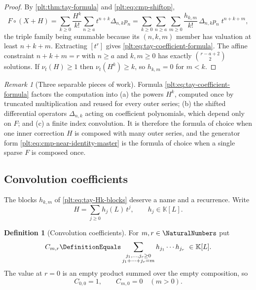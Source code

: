 \documentclass[11pt,oneside]{article}
\theoremstyle{plain}
\theoremstyle{definition}
\newtheorem{definition}[theorem]{Definition}
\theoremstyle{remark}
\newtheorem{remark}[theorem]{Remark}
\newcommand{\K}{\mathbb{K}}
\newcommand{\ordt}{\nu_{t}}                              %
\newcommand{\shiftop}[2]{\Delta_{#1,#2}}                 %
\newcommand{\compose}{\mathbin{\circ}}
\begin{document}
\begin{proof}
By \cref{plt:thm:tay-formula} and \eqref{plt:eq:cmp-shiftop},
\[
 F\compose(X+H)
 =\sum_{k\ge0}\frac{H^{k}}{k!}\sum_{n\ge a}t^{n+k}\shiftop{n}{k}p_n
 =\sum_{k\ge0}\sum_{n\ge a}\sum_{m\ge0}
   \frac{h_{k,m}}{k!}\,\shiftop{n}{k}p_n\;t^{n+k+m},
\]
the triple family being summable because its \((n,k,m)\) member has
valuation at least \(n+k+m\).  Extracting \([t^{r}]\) gives
\eqref{plt:eq:tay-coefficient-formula}.  The affine constraint
\(n+k+m=r\) with \(n\ge a\) and \(k,m\ge0\) has exactly
\(\binom{r-a+2}{2}\) solutions.  If \(\ordt(H)\ge1\) then
\(\ordt(H^{k})\ge k\), so \(h_{k,m}=0\) for \(m<k\).
\end{proof}

\begin{remark}[Three separable pieces of work]
Formula \eqref{plt:eq:tay-coefficient-formula} factors the computation into
(a) the powers \(H^{k}\), computed once by truncated multiplication and reused
for every outer series; (b) the shifted differential operators
\(\shiftop{n}{k}\) acting on coefficient polynomials, which depend only on
\(F\); and (c) a finite index convolution.  It is therefore the formula of
choice when one inner correction \(H\) is composed with many outer series, and
the generator form \eqref{plt:eq:cmp-near-identity-master} is the formula of
choice when a single sparse \(F\) is composed once.
\end{remark}

\subsection{Convolution coefficients}
\label{plt:sec:tay-convolution}

The blocks \(h_{k,m}\) of \eqref{plt:eq:tay-Hk-blocks} deserve a name and a
recurrence.  Write
\begin{equation}\label{plt:eq:tay-H-blocks}
 H=\sum_{j\ge0}h_{j}(L)\,t^{j},
 \qquad h_j\in\K[L].
\end{equation}

\begin{definition}[Convolution coefficients]\label{plt:def:tay-convolution}
For \(m,r\in\NaturalNumbers\) put
\begin{equation}\label{plt:eq:tay-C-def}
 C_{m,r}
 \DefinitionEquals
 \sum_{\substack{j_{1},\ldots,j_{r}\ge0\\ j_{1}+\cdots+j_{r}=m}}
   h_{j_{1}}\cdots h_{j_{r}}\ \in\K[L].
\end{equation}
The value at \(r=0\) is an empty product summed over the empty composition, so
\begin{equation}\label{plt:eq:tay-C-boundary}
 C_{0,0}=1,
 \qquad
 C_{m,0}=0\quad(m>0).
\end{equation}
\end{definition}
\end{document}

